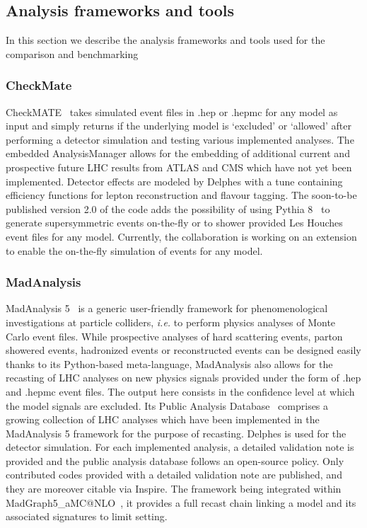 \documentclass[11pt]{cernrep}
\begin{document}
\subsection{Analysis frameworks and tools}
In this section we describe the analysis frameworks and tools used for the comparison and benchmarking

\subsubsection{CheckMate}
CheckMATE~\cite{Drees:2013wra,Cacciari:2005hq} takes simulated event files in .hep or .hepmc for any model as input and simply returns if the underlying model is `excluded' or `allowed' after
performing a detector simulation and testing various implemented analyses. The embedded AnalysisManager allows for the embedding of additional current and
prospective future LHC results from ATLAS and CMS which have not yet been implemented.
Detector effects are modeled by Delphes with a tune containing efficiency functions for lepton reconstruction and flavour tagging. The soon-to-be published version 2.0 of the code adds the possibility of using Pythia 8~\cite{Sjostrand:2007gs} to
generate supersymmetric events on-the-fly or to shower provided Les Houches
event files for any model. Currently, the collaboration is working on an extension to enable the on-the-fly simulation of events for any model.


\subsubsection{MadAnalysis}
MadAnalysis 5~\cite{Conte:2012fm,Conte:2014zja} is a generic user-friendly
framework for phenomenological investigations at particle colliders, {\it i.e.}
to perform physics analyses of Monte Carlo event files. While prospective
analyses of hard scattering events, parton showered events, hadronized events or
reconstructed events can be designed easily thanks to its Python-based
meta-language, MadAnalysis also allows for the recasting of LHC analyses on new
physics signals provided under the form of .hep and .hepmc event files. The
output here consists in the confidence level at which the model signals are
excluded.
Its Public Analysis Database~\cite{Dumont:2014tja} comprises a growing
collection of LHC analyses which have been implemented in the MadAnalysis 5
framework for the purpose of recasting. Delphes is used for the detector
simulation. For each implemented analysis, a detailed validation note is
provided and the public analysis database follows an open-source policy. Only
contributed codes provided with a detailed validation note are published, and
they are moreover citable via Inspire. The framework being integrated within
MadGraph5\_aMC@NLO~\cite{Alwall:2014hca}, it provides a full recast chain linking a model
and its associated signatures to limit setting.
\end{document}
